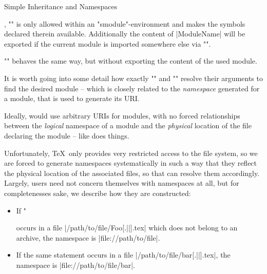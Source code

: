 \begin{sfragment}{Simple Inheritance and Namespaces}

    \begin{function}{\importmodule,\usemodule}
        \stexcode""
        is only allowed within an \stexcode"smodule"-environment
        and makes the symbols declared therein available. Additionally
        the content of |ModuleName| will be exported if the
        current module is imported somewhere else via
        \stexcode"\importmodule".

        \stexcode"\usemodule" behaves the same way, but without exporting
        the content of the used module.
    \end{function}

    It is worth going into some detail how exactly \stexcode"\importmodule"
    and \stexcode"\usemodule" resolve their arguments to find
    the desired module -- which is closely related to the
    \emph{namespace} generated for a module, that is used to generate
    its URI.

    \begin{dangerbox}
        Ideally, \sTeX would use arbitrary URIs for modules, with no
   forced relationships between the \emph{logical} namespace
   of a module and the \emph{physical} location of the file
   declaring the module -- like \mmt does things.

   Unfortunately, \TeX\ only provides very restricted access to
   the file system, so we are forced to generate namespaces
   systematically in such a way that they reflect the physical
   location of the associated files, so that \sTeX can resolve
   them accordingly. Largely, users need not concern themselves
   with namespaces at all, but for completenesses sake, we describe
   how they are constructed:

   \begin{itemize}
     \item If \stexcode"\fi occurs in a file
       |/path/to/file/Foo[.||].tex| which does not belong
       to an archive, the namespace is |file://path/to/file|.
     \item If the same statement occurs in a file
       |/path/to/file/bar[.||].tex|, the namespace is 
       |file://path/to/file/bar|.
   \end{itemize}


\end{dangerbox}
\end{sfragment}
